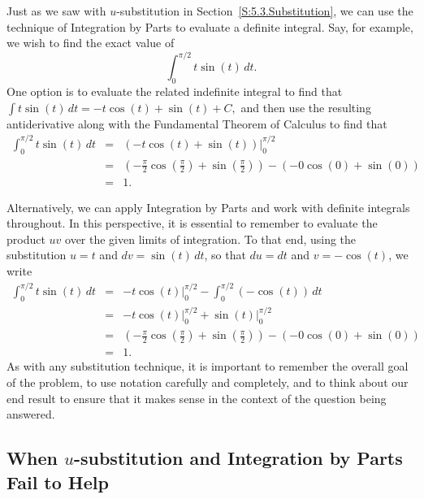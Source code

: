Just as we saw with $u$-substitution in Section~\ref{S:5.3.Substitution}, we can use the technique of Integration by Parts to evaluate a definite integral.  Say, for example, we wish to find the exact value of 
$$\int_0^{\pi/2} t\sin(t) \, dt.$$
One option is to evaluate the related indefinite integral to find that $\int t\sin(t) \, dt = -t \cos(t) + \sin(t) + C,$ and then use the resulting antiderivative along with the Fundamental Theorem of Calculus to find that
\begin{eqnarray*}
  \int_0^{\pi/2} t\sin(t) \, dt & = & \left( -t \cos(t) + \sin(t) \right) \bigg\vert_0^{\pi/2} \\
  					& = & \left( -\frac{\pi}{2} \cos(\frac{\pi}{2}) + \sin(\frac{\pi}{2}) \right) - \left( -0 \cos(0) + \sin(0) \right) \\
					& = & 1.
\end{eqnarray*}

Alternatively, we can apply Integration by Parts and work with definite integrals throughout.  In this perspective, it is essential to remember to evaluate the product $uv$ over the given limits of integration.  To that end, using the substitution $u = t$ and $dv = \sin(t) \, dt$, so that $du = dt$ and $v = -\cos(t)$, we write
\begin{eqnarray*}
  \int_0^{\pi/2} t\sin(t) \, dt & = &  -t \cos(t) \bigg\vert_0^{\pi/2} - \int_0^{\pi/2} (-\cos(t)) \, dt \\
  					& = &  -t \cos(t) \bigg\vert_0^{\pi/2}  +  \sin(t) \bigg\vert_0^{\pi/2}  \\
					& = & \left( -\frac{\pi}{2} \cos(\frac{\pi}{2}) + \sin(\frac{\pi}{2}) \right) - \left( -0 \cos(0) + \sin(0) \right) \\
					& = & 1.					
\end{eqnarray*}
As with any substitution technique, it is important to remember the overall goal of the problem, to use notation carefully and completely, and to think about our end result to ensure that it makes sense in the context of the question being answered.

\subsection*{When $u$-substitution and Integration by Parts Fail to Help}

